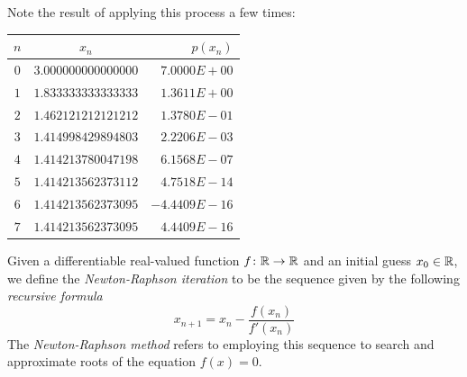 Note the result of applying this process a few times:
\begin{center}
\begin{tabular}{|c|c|r|} \hline 
$n$ & $x_n$ & $p(x_n)$ \\ \hline \hline 
$0$ & $3.000000000000000$ & $7.0000E+00$ \\ \hline 
$1$ & $1.833333333333333$ & $1.3611E+00$ \\ \hline 
$2$ & $1.462121212121212$ & $1.3780E-01$ \\ \hline 
$3$ & $1.414998429894803$ & $2.2206E-03$ \\ \hline 
$4$ & $1.414213780047198$ & $6.1568E-07$ \\ \hline 
$5$ & $1.414213562373112$ & $4.7518E-14$ \\ \hline 
$6$ & $1.414213562373095$ & $-4.4409E-16$ \\ \hline 
$7$ & $1.414213562373095$ & $4.4409E-16$ \\ \hline 
\end{tabular}
\end{center}

\begin{definition}
Given a differentiable real-valued function $f\colon \mathbb{R} \to \mathbb{R}$ and an initial guess $x_0 \in \mathbb{R}$, we define the \emph{Newton-Raphson iteration} to be the sequence given by the following \emph{recursive formula}
\begin{equation*}
x_{n+1} = x_n - \frac{f(x_n)}{f'(x_n)}
\end{equation*}
The \emph{Newton-Raphson method} refers to employing this sequence to search and approximate roots of the equation $f(x) = 0$.
\end{definition}


